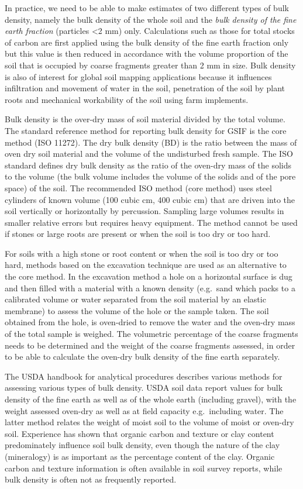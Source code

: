 \documentclass[11pt]{krantz}
\theoremstyle{definition}
\theoremstyle{definition}
\theoremstyle{definition}
\theoremstyle{remark}
\begin{document}
In practice, we need to be able to make estimates of two different types
of bulk density, namely the bulk density of the whole soil and the
\emph{bulk density of the fine earth fraction} (particles \textless{}2
mm) only. Calculations such as those for total stocks of carbon are
first applied using the bulk density of the fine earth fraction only but
this value is then reduced in accordance with the volume proportion of
the soil that is occupied by coarse fragments greater than 2 mm in size.
Bulk density is also of interest for global soil mapping applications
because it influences infiltration and movement of water in the soil,
penetration of the soil by plant roots and mechanical workability of the
soil using farm implements.

Bulk density is the over-dry mass of soil material divided by the total
volume. The standard reference method for reporting bulk density for
GSIF is the core method (ISO 11272). The dry bulk density (BD) is the
ratio between the mass of oven dry soil material and the volume of the
undisturbed fresh sample. The ISO standard defines dry bulk density as
the ratio of the oven-dry mass of the solids to the volume (the bulk
volume includes the volume of the solids and of the pore space) of the
soil. The recommended ISO method (core method) uses steel cylinders of
known volume (100 cubic cm, 400 cubic cm) that are driven into the soil
vertically or horizontally by percussion. Sampling large volumes results
in smaller relative errors but requires heavy equipment. The method
cannot be used if stones or large roots are present or when the soil is
too dry or too hard.

For soils with a high stone or root content or when the soil is too dry
or too hard, methods based on the excavation technique are used as an
alternative to the core method. In the excavation method a hole on a
horizontal surface is dug and then filled with a material with a known
density (e.g.~sand which packs to a calibrated volume or water separated
from the soil material by an elastic membrane) to assess the volume of
the hole or the sample taken. The soil obtained from the hole, is
oven-dried to remove the water and the oven-dry mass of the total sample
is weighed. The volumetric percentage of the coarse fragments needs to
be determined and the weight of the coarse fragments assessed, in order
to be able to calculate the oven-dry bulk density of the fine earth
separately.

The USDA handbook for analytical procedures describes various methods
for assessing various types of bulk density. USDA soil data report
values for bulk density of the fine earth as well as of the whole earth
(including gravel), with the weight assessed oven-dry as well as at
field capacity e.g.~including water. The latter method relates the
weight of moist soil to the volume of moist or oven-dry soil. Experience
has shown that organic carbon and texture or clay content predominately
influence soil bulk density, even though the nature of the clay
(mineralogy) is as important as the percentage content of the clay.
Organic carbon and texture information is often available in soil survey
reports, while bulk density is often not as frequently reported.
\end{document}
